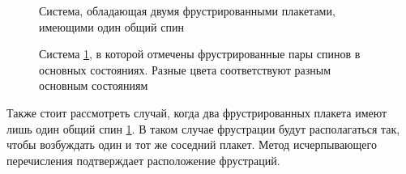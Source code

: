 \documentclass[utf8, babel, sor, jor, amsmath, amssymb, reprint]{elsarticle} %
\begin{document}
\begin{figure}[H]
	\centering
	\caption{Система, обладающая двумя фрустрированными плакетами, имеющими один общий спин}
	\label{fig:5x5.2F}
\end{figure}
\begin{figure}[H]
	\centering
	\caption{Система \ref{fig:5x5.2F}, в которой отмечены фрустрированные пары спинов в основных состояниях. Разные цвета соответствуют разным основным состояниям}
	\label{fig:5x5.22F}
\end{figure}
Также стоит рассмотреть случай, когда два фрустрированных плакета имеют лишь один общий спин \ref{fig:5x5.2F}.
В таком случае фрустрации будут располагаться так, чтобы возбуждать один и тот же соседний плакет.
Метод исчерпывающего перечисления подтверждает расположение фрустраций.
\end{document}
